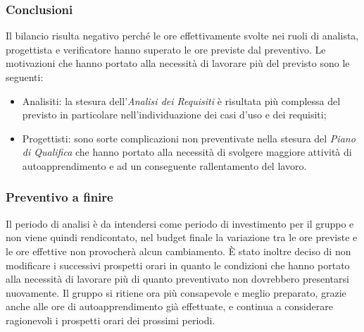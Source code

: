 		\subsubsection{Conclusioni}
		Il bilancio risulta negativo perché le ore effettivamente svolte nei ruoli di analista, progettista e verificatore hanno superato le ore previste dal preventivo.
		Le motivazioni che hanno portato alla necessità di lavorare più del previsto sono le seguenti:
		\begin{itemize}
			\item Analisiti: la stesura dell'\textit{Analisi dei Requisiti} è risultata più complessa del previsto in particolare nell'individuazione dei casi d'uso e dei requisiti;
			\item Progettisti: sono sorte complicazioni non preventivate nella stesura del \textit{Piano di Qualifica} che hanno portato alla necessità di svolgere maggiore attività di autoapprendimento e ad un conseguente rallentamento del lavoro.
		\end{itemize}
		\subsubsection{Preventivo a finire}
		Il periodo di analisi è da intendersi come periodo di investimento per il gruppo e non viene quindi rendicontato, nel budget finale la variazione tra le ore previste e le ore effettive non provocherà alcun cambiamento. 
		È stato inoltre deciso di non modificare i successivi prospetti orari in quanto le condizioni che hanno portato alla necessità di lavorare più di quanto preventivato non dovrebbero presentarsi nuovamente. Il gruppo si ritiene ora più consapevole e meglio preparato, grazie anche alle ore di autoapprendimento già effettuate, e continua a considerare ragionevoli i prospetti orari dei prossimi periodi.
